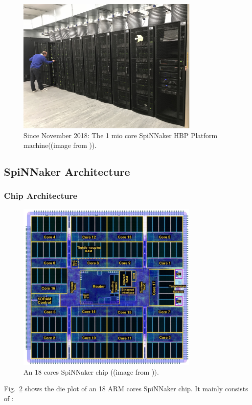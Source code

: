 \begin{figure}[!tb]
   \centering
       \includegraphics[width=0.8\textwidth]{figures/super_machine.jpg}
       \caption{Since November 2018: The 1 mio core SpiNNaker HBP Platform machine((image from \cite{super_machine})).}
       \label{fig:super_machine}
\end{figure}



\subsection{SpiNNaker Architecture} \label{sec:sa}
\subsubsection{Chip Architecture}
\begin{figure}[!tb]
   \centering
       \includegraphics[width=0.8\textwidth]{figures/spinn_labeled_bw.png}
       \caption{An 18 cores SpiNNaker chip ((image from \cite{spinn-core})).}
       \label{fig:spinn-core}
\end{figure}
Fig.~\ref{fig:spinn-core} shows the die plot of an 18 ARM cores SpiNNaker chip. It mainly consists of \cite{furber2012overview}:

